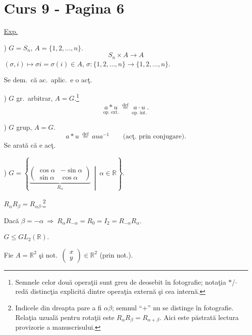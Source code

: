 
\section*{Curs 9 - Pagina 6}

\noindent\underline{Exp.}

) $G=S_n$, \qquad $A=\{1,2,\ldots,n\}$.
\[
S_n\times A\longrightarrow A
\]
\noindent $(\sigma,i)\longmapsto \sigma i=\sigma(i)\in A$, \qquad
$\sigma:\{1,2,\ldots,n\}\longrightarrow\{1,2,\ldots,n\}$.

\bigskip
\noindent Se dem.\ că ac.\ aplic.\ e o acţ.

\bigskip
{}) $G$ gr.\ arbitrar, $A=G$.\footnote{Semnele celor două operaţii sunt greu de deosebit în fotografie; notaţia $*$/$\cdot$ redă distincţia explicită dintre operaţia externă şi cea internă.}
\[
\underset{\text{op. ext.}}{a*u}
\ \overset{\mathrm{def}}{=}\
\underset{\text{op. int.}}{a\cdot u}.
\]

\bigskip
{}) $G$ grup, $A=G$.
\[
a*u\ \overset{\mathrm{def}}{=}\ aua^{-1}
\qquad\text{(acţ. prin conjugare)}.
\]
\noindent Se arată că e acţ.

\bigskip
{}) $G=\left\{
\underbrace{\begin{pmatrix}
\cos\alpha & -\sin\alpha\\
\sin\alpha & \cos\alpha
\end{pmatrix}}_{R_\alpha}
\ \middle|\ \alpha\in\mathbb{R}\right\}$.

\noindent $R_\alpha R_\beta=R_{\alpha\beta}$.\footnote{Indicele din dreapta pare a fi $\alpha\beta$; semnul ``$+$'' nu se distinge în fotografie. Relaţia uzuală pentru rotaţii este $R_\alpha R_\beta=R_{\alpha+\beta}$. Aici este păstrată lectura provizorie a manuscrisului.}

\bigskip
\noindent Dacă $\beta=-\alpha\ \Longrightarrow\
R_\alpha R_{-\alpha}=R_0=I_2=R_{-\alpha}R_\alpha$.

\bigskip
\noindent $G\leq GL_2(\mathbb{R})$.

\bigskip
\noindent Fie $A=\mathbb{R}^2$ şi not.\
$\begin{pmatrix}x\\y\end{pmatrix}\in\mathbb{R}^2$ (prin not.).

